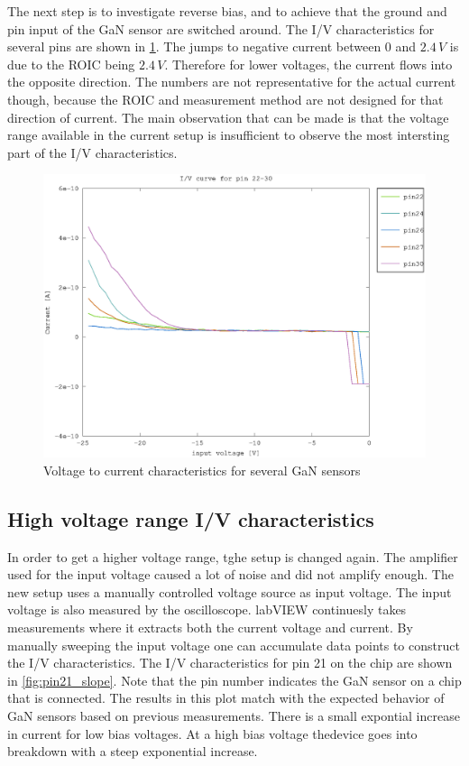 The next step is to investigate reverse bias, and to achieve that the ground and pin input of the GaN sensor are switched around. The I/V characteristics for several pins are shown in \cref{fig:pin22_30_slope}. The jumps to negative current between 0 and $2.4\,V$ is due to the ROIC being $2.4\,V$. Therefore for lower voltages, the current flows into the opposite direction. The numbers are not representative for the actual current though, because the ROIC and measurement method are not designed for that direction of current. The main observation that can be made is that the voltage range available in the current setup is insufficient to observe the most intersting part of the I/V characteristics.  

\begin{figure}[h]
	    \centering
	    \includegraphics[width=\textwidth]{fig/pin22-30_slope_-25-0V.eps}
	    \caption[]%
	    {Voltage to current characteristics for several GaN sensors}    
	    \label{fig:pin22_30_slope}	
\end{figure}  


\subsection{High voltage range I/V characteristics}
In order to get a higher voltage range, tghe setup is changed again. The amplifier used for the input voltage caused a lot of noise and did not amplify enough. The new setup uses a manually controlled voltage source as input voltage. The input voltage is also measured by the oscilloscope. labVIEW continuesly takes measurements where it extracts both the current voltage and current. By manually sweeping the input voltage one can accumulate data points to construct the I/V characteristics. The I/V characteristics for pin 21 on the chip are shown in \cref{fig:pin21_slope}. Note that the pin number indicates the GaN sensor on a chip that is connected. The results in this plot match with the expected behavior of GaN sensors based on previous measurements. There is a small expontial increase in current for low bias voltages. At a high bias voltage thedevice goes into breakdown with a steep exponential increase.

